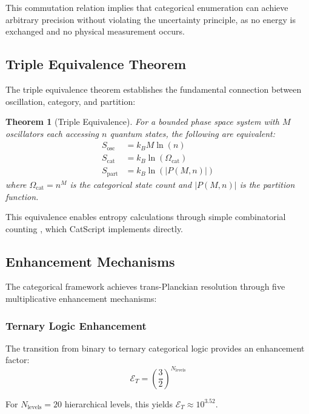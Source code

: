 \documentclass[twocolumn,10pt]{article}
\newtheorem{theorem}{Theorem}[section]
\begin{document}
This commutation relation implies that categorical enumeration can achieve arbitrary precision without violating the uncertainty principle, as no energy is exchanged and no physical measurement occurs.

\subsection{Triple Equivalence Theorem}

The triple equivalence theorem establishes the fundamental connection between oscillation, category, and partition:

\begin{theorem}[Triple Equivalence]
For a bounded phase space system with $M$ oscillators each accessing $n$ quantum states, the following are equivalent:
\begin{align}
    S_{\text{osc}} &= k_B M \ln(n) \\
    S_{\text{cat}} &= k_B \ln(\Omega_{\text{cat}}) \\
    S_{\text{part}} &= k_B \ln(|P(M,n)|)
\end{align}
where $\Omega_{\text{cat}} = n^M$ is the categorical state count and $|P(M,n)|$ is the partition function.
\end{theorem}

This equivalence enables entropy calculations through simple combinatorial counting \cite{landau1980statistical,jaynes1957}, which CatScript implements directly.

\subsection{Enhancement Mechanisms}

The categorical framework achieves trans-Planckian resolution through five multiplicative enhancement mechanisms:

\subsubsection{Ternary Logic Enhancement}

The transition from binary to ternary categorical logic provides an enhancement factor:
\begin{equation}
    \mathcal{E}_T = \left(\frac{3}{2}\right)^{N_{\text{levels}}}
\end{equation}

For $N_{\text{levels}} = 20$ hierarchical levels, this yields $\mathcal{E}_T \approx 10^{3.52}$.
\end{document}

